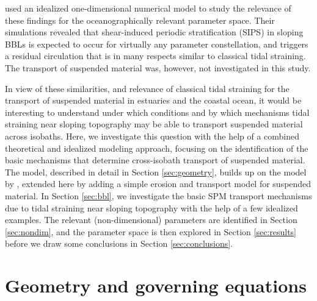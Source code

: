 \cite{UmlaufBurchard2011a} used an idealized one-dimensional numerical
model to study the relevance of these findings for the
oceanographically relevant parameter space. Their simulations revealed
that shear-induced periodic stratification (SIPS) in sloping BBLs is
expected to occur for virtually any parameter constellation, and
triggers a residual circulation that is in many respects similar to
classical tidal straining. The transport of suspended material was,
however, not investigated in this study.

In view of these similarities, and relevance of classical tidal
straining for the transport of suspended material in estuaries and the
coastal ocean, it would be interesting to understand under which
conditions and by which mechanisms tidal straining near sloping
topography may be able to transport suspended material across
isobaths. Here, we investigate this question with the help of a
combined theoretical and idealized modeling approach, focusing on the
identification of the basic mechanisms that determine cross-isobath
transport of suspended material. The model, described in detail in
Section \ref{sec:geometry}, builds up on the model by
\cite{UmlaufBurchard2011a}, extended here by adding a simple erosion
and transport model for suspended material. In Section \ref{sec:bbl},
we investigate the basic SPM transport mechanisms due to tidal
straining near sloping topography with the help of a few idealized
examples. The relevant (non-dimensional) parameters are identified in
Section \ref{sec:nondim}, and the parameter space is then explored in
Section \ref{sec:results} before we draw some conclusions in Section
\ref{sec:conclusions}.


\section{Geometry and governing equations\label{sec:geometry}}

